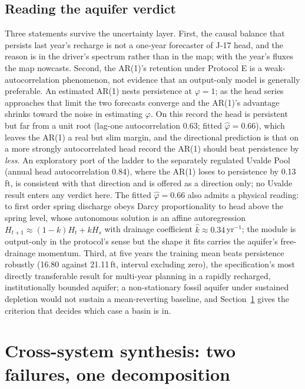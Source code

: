 \documentclass[preprint,11pt,authoryear]{elsarticle}
\theoremstyle{definition}
\theoremstyle{remark}
\begin{document}
\subsection{Reading the aquifer verdict}\label{sec:edwreading}

Three statements survive the uncertainty layer. First, the causal balance that persists last year's recharge is not a one-year forecaster of J-17 head, and the reason is in the driver's spectrum rather than in the map; with the year's fluxes the map nowcasts. Second, the AR(1)'s retention under Protocol E is a weak-autocorrelation phenomenon, not evidence that an output-only model is generally preferable. An estimated AR(1) nests persistence at $\varphi=1$; as the head series approaches that limit the two forecasts converge and the AR(1)'s advantage shrinks toward the noise in estimating $\varphi$. On this record the head is persistent but far from a unit root (lag-one autocorrelation 0.63; fitted $\hat\varphi=0.66$), which leaves the AR(1) a real but slim margin, and the directional prediction is that on a more strongly autocorrelated head record the AR(1) should beat persistence by \emph{less}. An exploratory port of the ladder to the separately regulated Uvalde Pool (annual head autocorrelation 0.84), where the AR(1) loses to persistence by 0.13\,ft, is consistent with that direction and is offered as a direction only; no Uvalde result enters any verdict here. The fitted $\hat\varphi=0.66$ also admits a physical reading: to first order spring discharge obeys Darcy proportionality to head above the spring level, whose autonomous solution is an affine autoregression $H_{t+1}\approx(1-k)H_t+kH_s$ with drainage coefficient $\hat k\approx0.34$\,yr$^{-1}$; the module is output-only in the protocol's sense but the shape it fits carries the aquifer's free-drainage momentum. Third, at five years the training mean beats persistence robustly (16.80 against 21.11\,ft, interval excluding zero), the specification's most directly transferable result for multi-year planning in a rapidly recharged, institutionally bounded aquifer; a non-stationary fossil aquifer under sustained depletion would not sustain a mean-reverting baseline, and Section~\ref{sec:synthesis} gives the criterion that decides which case a basin is in.
\FloatBarrier
\section{Cross-system synthesis: two failures, one decomposition}\label{sec:synthesis}
\end{document}
